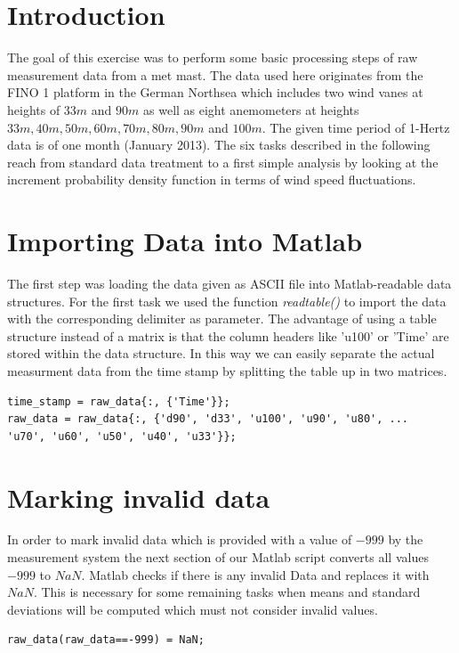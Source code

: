 \documentclass[10pt]{article}
\begin{document}
\lstset{
	language=Matlab,
	basicstyle=\footnotesize,
	xleftmargin=.2\textwidth,
	xrightmargin=.2\textwidth
}


\onehalfspacing

\tableofcontents
\newpage
\section*{Introduction}
The goal of this exercise was to perform some basic processing steps of raw measurement data from a met mast. The data used here originates from the FINO 1 platform in the German Northsea which includes two wind vanes at heights of $33m$ and $90m$ as well as eight anemometers at heights $33m, 40m, 50m, 60m, 70m, 80m, 90m$ and $100m$. The given time period of 1-Hertz data is of one month (January 2013). The six tasks described in the following reach from standard data treatment to a first simple analysis by looking at the increment probability density function in terms of wind speed fluctuations.

\section{Importing Data into Matlab}
The first step was loading the data given as ASCII file into Matlab-readable data structures. For the first task we used the function \textit{readtable()} to import the data with the corresponding delimiter as parameter. The advantage of using a table structure instead of a matrix is that the column headers like 'u100' or 'Time' are stored within the data structure. In this way we can easily separate the actual measurment data from the time stamp by splitting the table up in two matrices. \\
\begin{lstlisting}
time_stamp = raw_data{:, {'Time'}};
raw_data = raw_data{:, {'d90', 'd33', 'u100', 'u90', 'u80', ...
'u70', 'u60', 'u50', 'u40', 'u33'}};
\end{lstlisting}

\section{Marking invalid data}
In order to mark invalid data which is provided with a value of $-999$ by the measurement system the next section of our Matlab script converts all values $-999$ to $NaN$. Matlab checks if there is any invalid Data and replaces it with $NaN$. This is necessary for some remaining tasks when means and standard deviations will be computed which must not consider invalid values.\\
\begin{lstlisting}
raw_data(raw_data==-999) = NaN;
\end{lstlisting}
\end{document}
